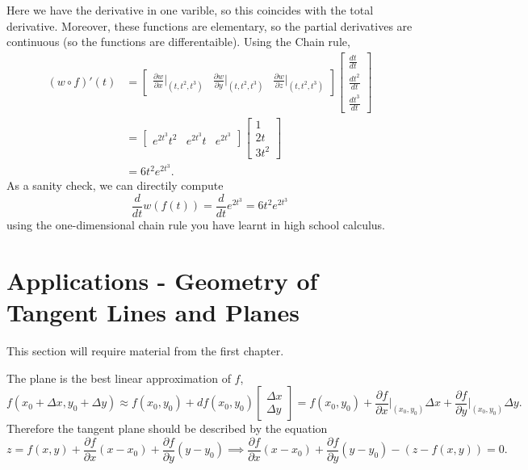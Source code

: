 Here we have the derivative in one varible, so this coincides with the total derivative. Moreover, these functions are elementary, so the partial derivatives are continuous (so the functions are differentaible). Using the Chain rule, \begin{align*}
    (w\circ f)'(t) &= \begin{bmatrix}
        \frac{\partial w}{\partial x}|_{(t,t^2,t^3)}&\frac{\partial w}{\partial y}|_{(t,t^2,t^3)}&\frac{\partial w}{\partial z}|_{(t,t^2,t^3)}
    \end{bmatrix}
    \begin{bmatrix}
        \frac{d t}{dt} \\ \frac{dt^2}{dt} \\ \frac{dt^3}{dt}
    \end{bmatrix} \\
    &=\begin{bmatrix}
       e^{2t^3}t^2&e^{2t^3}t&e^{2t^3}
    \end{bmatrix}
    \begin{bmatrix}
        1 \\ 2t \\ 3t^2
    \end{bmatrix}\\
    &= 6t^2 e^{2t^3}.
\end{align*}
As a sanity check, we can directily compute \[
\frac{d}{dt} w(f(t)) = \frac{d}{dt}e^{2t^3} = 6t^2e^{2t^3}
\]
using the one-dimensional chain rule you have learnt in high school calculus.
\section{Applications - Geometry of Tangent Lines and Planes }
This section will require material from the first chapter.

The plane is the best linear approximation of $f$, \[
    f(x_0+\Delta x,y_0+\Delta y) \approx f(x_0,y_0)+ df(x_0,y_0)\begin{bmatrix}
        \Delta x \\ \Delta y
    \end{bmatrix} = f(x_0,y_0)+\frac{\partial f}{\partial x}\bigg|_{(x_0,y_0)} \Delta x + \frac{\partial f}{\partial y}\bigg|_{(x_0,y_0)} \Delta y.
\]
Therefore the tangent plane should be described by the equation \[
    z=f(x,y)+\frac{\partial f}{\partial x} (x-x_0)+\frac{\partial f}{\partial y} (y-y_0)\implies  \frac{\partial f}{\partial x} (x-x_0)+\frac{\partial f}{\partial y} (y-y_0)-(z-f(x,y))=0.
\]


